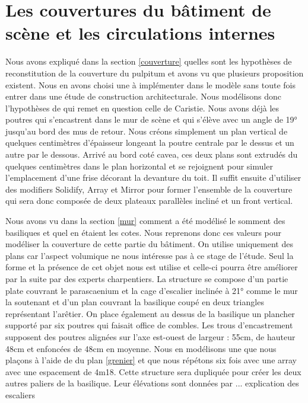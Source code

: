 		
\section{Les couvertures du bâtiment de scène et les circulations internes}

Nous avons expliqué dans la section \ref{couverture} quelles sont les hypothèses de reconstitution de la couverture du pulpitum et avons vu que plusieurs proposition existent. Nous en avons choisi une à implémenter dans le modèle sans toute fois entrer dans une étude de construction architecturale. Nous modélisons donc l'hypothèses de \cite[Chap. I, sect. 6]{orangeTxt} qui remet en question celle de Caristie. Nous avons déjà les poutres qui s'encastrent dans le mur de scène et qui s'élève avec un angle de 19° jusqu'au bord des mus de retour. Nous créons simplement un plan vertical de quelques centimètres d'épaisseur longeant la poutre centrale par le dessus et un autre par le dessous. Arrivé au bord coté cavea, ces deux plans sont extrudés du quelques centimètres dans le plan horizontal et se rejoignent pour simuler l'emplacement d'une frise décorant la devanture du toit. Il suffit ensuite d'utiliser des modifiers Solidify, Array et Mirror pour former l'ensemble de la couverture qui sera donc composée de deux plateaux parallèles incliné et un front vertical.

Nous avons vu dans la section \ref{mur} comment a été modélisé le somment des basiliques et quel en étaient les cotes. Nous reprenons donc ces valeurs pour modéliser la couverture de cette partie du bâtiment. On utilise uniquement des plans car l'aspect volumique ne nous intéresse pas à ce stage de l'étude. Seul la forme et la présence de cet objet nous est utilise et celle-ci pourra être améliorer par la suite par des experts charpentiers. La structure se compose d'un partie plate couvrant le parascaenium et la cage d'escalier inclinée à 21° comme le mur la soutenant et d'un plan couvrant la basilique coupé en deux triangles représentant l'arêtier. On place également au dessus de la basilique un plancher supporté par six poutres qui faisait office de combles. Les trous d'encastrement supposent des poutres alignées sur l'axe est-ouest de largeur : 55cm, de hauteur 48cm et enfoncées de 48cm en moyenne. Nous en modélisons une que nous plaçons à l'aide de du plan \ref{grenier} et que nous répétons six fois avec une \gls{array} avec une espacement de 4m18. Cette structure sera dupliquée pour créer les deux autres paliers de la basilique. Leur élévations sont données par ... explication des escaliers

